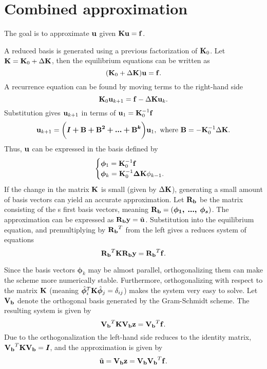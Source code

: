 \documentclass{article}
\begin{document}
\section{Combined approximation}
The goal is to approximate $\mathbf{u}$ given $\mathbf{K} \mathbf{u} = \mathbf{f}$.

A reduced basis is generated using a previous factorization of $\mathbf{K} _0$. Let $\mathbf{K} = \mathbf{K}_0 + \Delta\mathbf{K}$, then the equilibrium equations can be written as
\begin{equation}
    (\mathbf{K} _0 + \Delta\mathbf{K})\mathbf{u} = \mathbf{f}.
\end{equation}
A recurrence equation can be found by moving terms to the right-hand side
\begin{equation}
    \mathbf{K} _0 \mathbf{u}_{k + 1} = \mathbf{f} - \Delta\mathbf{K} \mathbf{u}_k.
\end{equation}
Substitution gives $\mathbf{u}_{k + 1}$ in terms of $\mathbf{u}_1 = \mathbf{K}^{-1}_0 \mathbf{f}$
\begin{equation}
    \mathbf{u}_{k + 1} = \bigg( \bm{I + \mathbf{B} + \mathbf{B}^2 + ... + \mathbf{B}^k}\bigg)\mathbf{u}_1, \ \text{where} \ \mathbf{B} = -\mathbf{K}^{-1}_0 \Delta\mathbf{K}.
\end{equation}
Thus, $\mathbf{u}$ can be expressed in the basis defined by
\[
\begin{cases}
    \bm \phi_1 = \mathbf{K}^{-1}_0 \mathbf{f} \\
    \bm \phi_k = \mathbf{K}^{-1}_0 \bm {\Delta\mathbf{K}} \phi_{k-1}.
\end{cases}
\]
If the change in the matrix $\mathbf{K}$ is small (given by $\Delta\mathbf{K}$), generating a small amount of basis vectors can yield an accurate approximation. Let $\mathbf{R_b}$ be the matrix consisting of the s first basis vectors, meaning $\mathbf{R_b} = (\bm{\phi_1, \; ..., \; \phi_s})$. The approximation can be expressed as $\Rb \Vec{y} = \tu$. Substitution into the equilibrium equation, and premultiplying by $\mathbf{R_b}^T$ from the left gives a reduces system of equations
\begin{equation}
    \Rb ^T \K \Rb \Vec{y} = \Rb^T \f.
\end{equation}

Since the basis vectors $\bm \phi_k$ may be almost parallel, orthogonalizing them can make the scheme more numerically stable. Furthermore, orthogonalizing with respect to the matrix $\mathbf{K}$ (meaning $\hat{\bm\phi}_i^T \mathbf{K} \hat{\bm\phi}_j = \delta_{ij}$) makes the system very easy to solve. Let $\mathbf{V_b}$ denote the orthogonal basis generated by the Gram-Schmidt scheme. The resulting system is given by
$$
\Vb ^T \K \Vb \Vec{z} = \Vb^T \f.
$$
Due to the orthogonalization the left-hand side reduces to the identity matrix, $\mathbf{V_b} ^T \mathbf{K} \mathbf{V_b} = \bm I$, and the approximation is given by
$$
\tu = \Vb \Vec{z} = \Vb \Vb^T \f.
$$
\end{document}
